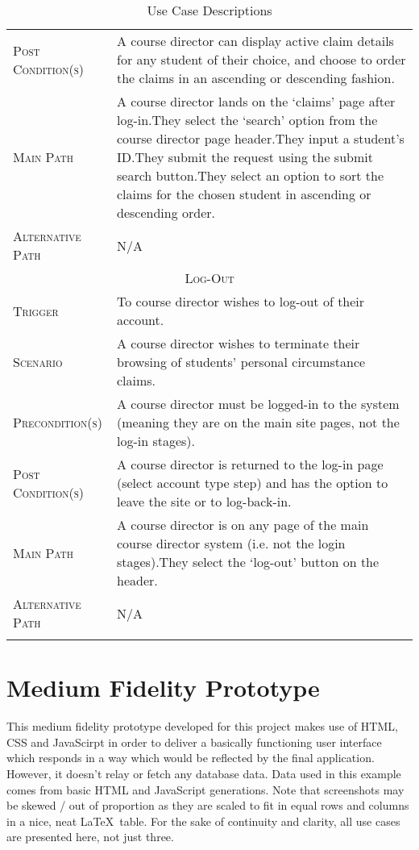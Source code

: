 \documentclass[11pt, english]{article}
\begin{document}
\begin{center}
\begin{longtable}{p{3cm}|p{9cm}}
		\textsc{Post Condition(s)} & A course director can display active claim details for any student of their choice, and choose to order the claims in an ascending or descending fashion.\\
		\textsc{Main Path} & A course director lands on the `claims' page after log-in.\newline They select the `search' option from the course director page header.\newline They input a student's ID.\newline They submit the request using the submit search button.\newline They select an option to sort the claims for the chosen student in ascending or descending order.\\
		\textsc{Alternative Path} & N/A\\
		\hline
		\multicolumn{2}{c}{\textsc{Log-Out}}\\
		\hline
		\textsc{Trigger} & To course director wishes to log-out of their account.\\
		\textsc{Scenario} & A course director wishes to terminate their browsing of students' personal circumstance claims.\\
		\textsc{Precondition(s)} & A course director must be logged-in to the system (meaning they are on the main site pages, not the log-in stages).\\
		\textsc{Post Condition(s)} & A course director is returned to the log-in page (select account type step) and has the option to leave the site or to log-back-in.\\
		\textsc{Main Path} & A course director is on any page of the main course director system (i.e. not the login stages).\newline They select the `log-out' button on the header.\\
		\textsc{Alternative Path} & N/A\\
		\hline
		\caption{Use Case Descriptions}
	\end{longtable}
	\end{center}
	
\newpage

\section{Medium Fidelity Prototype}

	This medium fidelity prototype developed for this project makes use of HTML, CSS and JavaScirpt in order to deliver a basically functioning user interface which responds in a way which would be reflected by the final application. However, it doesn't relay or fetch any database data. Data used in this example comes from basic HTML and JavaScript generations. Note that screenshots may be skewed / out of proportion as they are scaled to fit in equal rows and columns in a nice, neat \LaTeX\ table. For the sake of continuity and clarity, all use cases are presented here, not just three.
\end{document}
